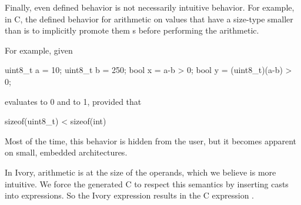 Finally, even defined behavior is not necessarily intuitive behavior.  For
example, in C, the defined behavior for arithmetic on values that have a
size-type smaller than  is to implicitly promote them s before
performing the arithmetic.

For example, given
\begin{code}
uint8\_t a = 10;
uint8\_t b = 250;
bool    x = a-b > 0;
bool    y = (uint8\_t)(a-b) > 0;
\end{code}
\noindent
{} evaluates to 0 and  to 1, provided that
\begin{code}
sizeof(uint8\_t) < sizeof(int)
\end{code}
\noindent
Most of the time, this behavior is hidden from the user, but it becomes apparent
on small, embedded architectures.

In Ivory, arithmetic is at the size of the operands, which we believe is more
intuitive.  We force the generated C to respect this semantics by inserting
casts into expressions.  So the Ivory expression  results in the C
expression .





